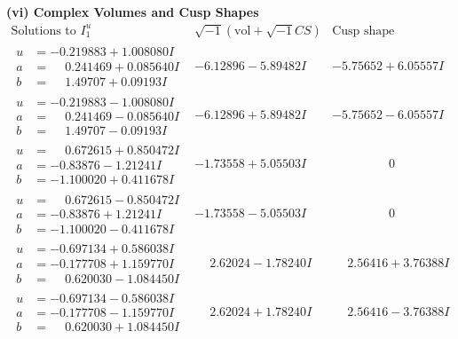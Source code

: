 \documentclass[1p]{elsarticle_modified}
\theoremstyle{definition}
\newcommand{\I}{\sqrt{-1}}
\begin{document}
\newpage\flushleft \textbf{(vi) Complex Volumes and Cusp Shapes}
$$\begin{array}{c|c|c}  
\text{Solutions to }I^u_{1}& \I (\text{vol} + \sqrt{-1}CS) & \text{Cusp shape}\\
 \hline 
\begin{aligned}
u &= -0.219883 + 1.008080 I \\
a &= \phantom{-}0.241469 + 0.085640 I \\
b &= \phantom{-}1.49707 + 0.09193 I\end{aligned}
 & -6.12896 - 5.89482 I & -5.75652 + 6.05557 I \\ \hline\begin{aligned}
u &= -0.219883 - 1.008080 I \\
a &= \phantom{-}0.241469 - 0.085640 I \\
b &= \phantom{-}1.49707 - 0.09193 I\end{aligned}
 & -6.12896 + 5.89482 I & -5.75652 - 6.05557 I \\ \hline\begin{aligned}
u &= \phantom{-}0.672615 + 0.850472 I \\
a &= -0.83876 - 1.21241 I \\
b &= -1.100020 + 0.411678 I\end{aligned}
 & -1.73558 + 5.05503 I & \phantom{-0.000000 } 0 \\ \hline\begin{aligned}
u &= \phantom{-}0.672615 - 0.850472 I \\
a &= -0.83876 + 1.21241 I \\
b &= -1.100020 - 0.411678 I\end{aligned}
 & -1.73558 - 5.05503 I & \phantom{-0.000000 } 0 \\ \hline\begin{aligned}
u &= -0.697134 + 0.586038 I \\
a &= -0.177708 + 1.159770 I \\
b &= \phantom{-}0.620030 - 1.084450 I\end{aligned}
 & \phantom{-}2.62024 - 1.78240 I & \phantom{-}2.56416 + 3.76388 I \\ \hline\begin{aligned}
u &= -0.697134 - 0.586038 I \\
a &= -0.177708 - 1.159770 I \\
b &= \phantom{-}0.620030 + 1.084450 I\end{aligned}
 & \phantom{-}2.62024 + 1.78240 I & \phantom{-}2.56416 - 3.76388 I \\ \hline\begin{aligned}

\end{aligned}
\end{array}$$
\end{document}
